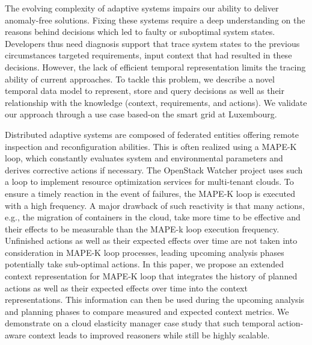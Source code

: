 The evolving complexity of adaptive systems impairs our ability to deliver anomaly-free solutions. Fixing these systems
require a deep understanding on the reasons behind decisions which led to faulty or suboptimal system states. Developers thus
need diagnosis support that trace system states to the previous circumstances targeted requirements, input context that had
resulted in these decisions. However, the lack of efficient temporal representation limits the tracing ability of current approaches. To tackle this problem, we describe a novel temporal data model to represent, store and query decisions as well as their relationship with the knowledge (context, requirements, and actions). We validate our approach through a use case based-on the smart grid at Luxembourg.


Distributed adaptive systems are composed of federated entities offering remote inspection and reconfiguration abilities. This is often realized using a MAPE-K loop, which constantly evaluates system and environmental parameters and derives corrective actions if necessary. The OpenStack Watcher project uses such a loop to implement resource optimization services for multi-tenant clouds. To ensure a timely reaction in the event of failures, the MAPE-K loop is executed with a high frequency. A major drawback of such reactivity is that many actions, e.g., the migration of containers in the cloud, take more time to be effective and their effects to be measurable than the MAPE-k loop execution frequency. Unfinished actions as well as their expected effects over time are not taken into consideration in MAPE-K loop processes, leading upcoming analysis phases potentially take sub-optimal actions. In this paper, we propose an extended context representation for MAPE-K loop that integrates the history of planned actions as well as their expected effects over time into the context representations. This information can then be used during the upcoming analysis and planning phases to compare measured and expected context metrics. We demonstrate on a cloud elasticity manager case study that such temporal action-aware context leads to improved reasoners while still be highly scalable.









